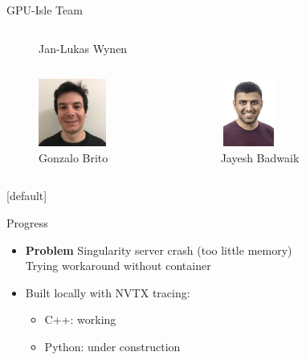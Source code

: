 \documentclass{beamer}
\begin{document}
\begin{frame}{GPU-Isle Team}
\begin{columns}
\begin{column}{0.25\textwidth}
\begin{figure}
\caption{Jan-Lukas Wynen}
\end{figure}
\end{column}
\end{columns}
\begin{columns}
\begin{column}{0.25\textwidth}
\begin{figure}
\includegraphics[width=6em,height=6em]{HackathonSlides/Pictures/Gonzalo.jpg}
\vspace*{-2em}
\caption{Gonzalo Brito}
\end{figure}
\end{column}
\begin{column}{0.25\textwidth}
\begin{figure}
\includegraphics[width=5em,height=6em]{HackathonSlides/Pictures/jayesh.jpg}
\vspace*{-2em}
\caption{Jayesh Badwaik}
\end{figure}
\end{column}
\begin{column}{0.5\textwidth}

\end{column}
\end{columns}
\end{frame}
[default]

\begin{frame}{Progress}
\begin{itemize}
\item \textbf{Problem} Singularity server crash (too little memory)\\
      Trying workaround without container\\[2ex]
\item Built locally with NVTX tracing:
\begin{itemize}
\item C++: working
\item Python: under construction
\end{itemize}
\end{itemize}
\end{frame}
\end{document}
